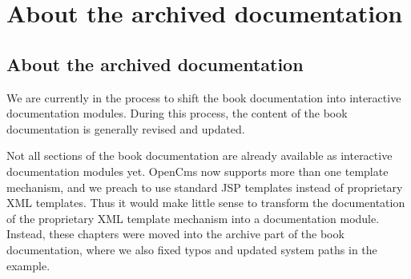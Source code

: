 \chapter{About the archived documentation}
\section{About the archived documentation}

We are currently in the process to shift the book documentation
into interactive documentation modules. During this process, the
content of the book documentation is generally revised and updated.

Not all sections of the book documentation are already available
as interactive documentation modules yet. OpenCms now supports more 
than one template mechanism, and we preach to use standard JSP templates 
instead of proprietary XML templates. Thus it would make little sense
to transform the documentation of the proprietary XML template mechanism 
into a documentation module. Instead, these chapters were moved into the
archive part of the book documentation, where we also fixed typos and 
updated system paths in the example.